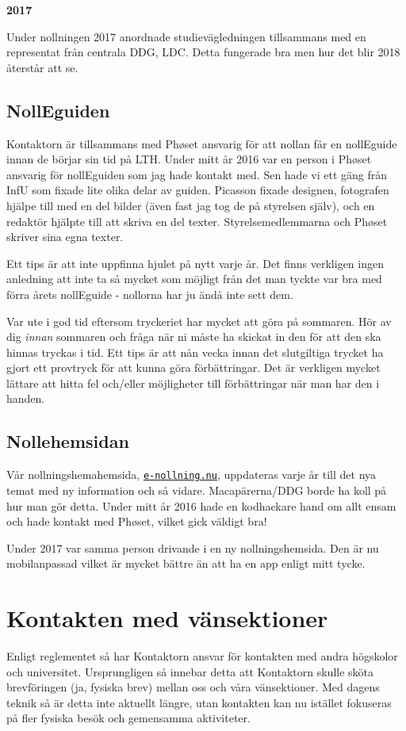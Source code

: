 \documentclass[10pt]{article}
\begin{document}
\textbf{2017}

Under nollningen 2017 anordnade studievägledningen tillsammans med en representat från centrala DDG, LDC. Detta fungerade bra men hur det blir 2018 återstår att se.
\subsection{NollEguiden}
Kontaktorn är tillsammans med Ph\o set ansvarig för att nollan får en nollEguide innan de börjar sin tid på LTH. Under mitt år 2016 var en person i Ph\o set ansvarig för nollEguiden som jag hade kontakt med. Sen hade vi ett gäng från InfU som fixade lite olika delar av guiden. Picasson fixade designen, fotografen hjälpe till med en del bilder (även fast jag tog de på styrelsen själv), och en redaktör hjälpte till att skriva en del texter. Styrelsemedlemmarna och Ph\o set skriver sina egna texter.

Ett tips är att inte uppfinna hjulet på nytt varje år. Det finns verkligen ingen anledning att inte ta så mycket som möjligt från det man tyckte var bra med förra årets nollEguide - nollorna har ju ändå inte sett dem.

Var ute i god tid eftersom tryckeriet har mycket att göra på sommaren. Hör av dig \emph{innan} sommaren och fråga när ni måste ha skickat in den för att den ska hinnas tryckas i tid. Ett tips är att nån vecka innan det slutgiltiga trycket ha gjort ett provtryck för att kunna göra förbättringar. Det är verkligen mycket lättare att hitta fel och/eller möjligheter till förbättringar när man har den i handen.

\subsection{Nollehemsidan}
Vår nollningshemahemsida, \href{https://e-nollning.nu}{\texttt{e-nollning.nu}}, uppdateras varje år till det nya temat med ny information och så vidare. Macapärerna/DDG borde ha koll på hur man gör detta. Under mitt år 2016 hade en kodhackare hand om allt ensam och hade kontakt med Ph\o set, vilket gick väldigt bra!

Under 2017 var samma person drivande i en ny nollningshemsida. Den är nu mobilanpassad vilket är mycket bättre än att ha en app enligt mitt tycke.
\section{Kontakten med vänsektioner}
Enligt reglementet så har Kontaktorn ansvar för kontakten med andra högskolor och universitet. Ursprungligen så innebar detta att Kontaktorn skulle sköta brevföringen (ja, fysiska brev) mellan oss och våra vänsektioner. Med dagens teknik så är detta inte aktuellt längre, utan kontakten kan nu istället fokuseras på fler fysiska besök och gemensamma aktiviteter.
\end{document}
